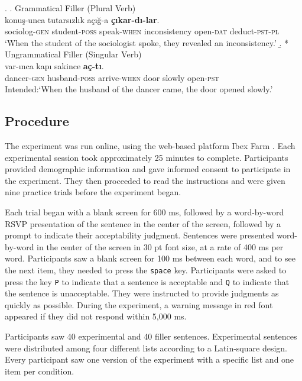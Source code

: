 \documentclass[apacite,linguex]{glossa}\usepackage[]{graphicx}\usepackage[]{color}
\begin{document}
\ex. \label{ex:fillers}
  \a. Grammatical Filler (Plural Verb) \label{ex:gram_filler}\\
   konu\c{s}-unca tutars{\i}zl{\i}k a\c{c}{\i}\u{g}-a \textbf{\c{c}{\i}kar-d{\i}-lar}.\\ 
  sociolog-\textsc{gen}  student-\textsc{poss} speak-\textsc{when} inconsistency  open-\textsc{dat} deduct-\textsc{pst}-\textsc{pl}\\
  \glt `When the student of the sociologist spoke, they revealed an inconsistency.'
  \b. * Ungrammatical Filler (Singular Verb) \label{ex:ung_filler}\\
   var-{\i}nca kap{\i} sakince \textbf{a\c{c}-t{\i}}. \\
  dancer-\textsc{gen}  husband-\textsc{poss} arrive-\textsc{when} door slowly  open-\textsc{pst}\\
  \glt Intended:`When the husband of the dancer came, the door opened slowly.'


\subsection{Procedure}

The experiment was run online, using the web-based platform Ibex Farm \citep{Drummond2013}. Each experimental session took approximately 25 minutes to complete. Participants provided demographic information and gave informed consent to participate in the experiment. They then proceeded to read the instructions and were given nine practice trials before the experiment began.

Each trial began with a blank screen for 600 ms, followed by a word-by-word RSVP presentation of the sentence in the center of the screen, followed by a prompt to indicate their acceptability judgment. Sentences were presented word-by-word in the center of the screen in 30 pt font size, at a rate of 400 ms per word. Participants saw a blank screen for 100 ms between each word, and to see the next item, they needed to press the \texttt{space} key. Participants were asked to press the key \texttt{P} to indicate that a sentence is acceptable and \texttt{Q} to indicate that the sentence is unacceptable. They were instructed to provide judgments as quickly as possible. During the experiment, a warning message in red font appeared if they did not respond within 5,000 ms.

Participants saw 40 experimental and 40 filler sentences. Experimental sentences were distributed among four different lists according to a Latin-square design. Every participant saw one version of the experiment with a specific list and one item per condition.
\end{document}
